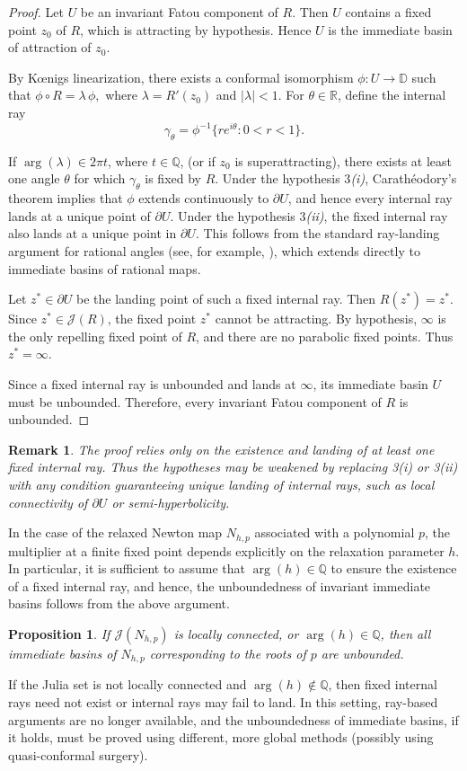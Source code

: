 \documentclass[12pt]{article}
\newtheorem{prop}{Proposition}[section]
\newtheorem{rem}{Remark}[section]
\numberwithin{equation}{section}
\begin{document}
\begin{proof}
Let $U$ be an invariant Fatou component of $R$.
Then $U$ contains a fixed point $z_0$ of $R$, which is attracting by hypothesis.
Hence $U$ is the immediate basin of attraction of $z_0$.
	
By K{\oe}nigs linearization, there exists a conformal isomorphism $\phi:U\to\mathbb D$
such that $\phi\circ R = \lambda\,\phi,$
where $\lambda=R'(z_0)$ and $|\lambda|<1$. For $\theta\in\mathbb R$, define the internal ray
$$\gamma_\theta=\phi^{-1}\{re^{i\theta}:0<r<1\}.$$
	
If $\arg(\lambda) \in 2\pi t$, where $t \in \mathbb Q$, (or if $z_0$ is superattracting), there exists at least one angle $\theta$ for which $\gamma_\theta$ is fixed by $R$.
Under the hypothesis 3\emph{(i)}, Carath\'eodory's theorem implies that $\phi$ extends continuously to $\partial U$, and hence every internal ray lands at a unique point of $\partial U$.
Under the hypothesis 3\emph{(ii)}, the fixed internal ray also lands at a unique point in $\partial U$. This follows from the standard ray-landing argument for rational angles (see, for example, \cite[Theorem 18.10]{Milnor_book}), which extends directly to immediate basins of rational maps.
	
Let $z^*\in\partial U$ be the landing point of such a fixed internal ray.
Then $R(z^*)=z^*$.
Since $z^*\in \mathcal{J}(R)$, the fixed point $z^*$ cannot be attracting.
By hypothesis, $\infty$ is the only repelling fixed point of $R$, and there are no parabolic fixed points.
Thus $z^*=\infty$.
	
Since a fixed internal ray is unbounded and lands at $\infty$, its immediate basin $U$ must be unbounded.
Therefore, every invariant Fatou component of $R$ is unbounded.
\end{proof}

\begin{rem}
The proof relies only on the existence and landing of at least one fixed internal ray.
Thus the hypotheses may be weakened by replacing \emph{3}(i) or \emph{3}(ii) with any condition guaranteeing unique landing of internal rays, such as local connectivity of $\partial U$ or semi-hyperbolicity.
\end{rem}	
In the case of the relaxed Newton map $N_{h,p}$ associated with a polynomial $p$, the multiplier at a finite fixed point depends explicitly on the relaxation parameter $h$.
In particular, it is sufficient to assume that $\arg(h)\in\mathbb Q$ to ensure the existence of a fixed internal ray, and hence, the unboundedness of invariant immediate basins follows from the above argument.
\begin{prop}\label{unbdd_imm}
If $\mathcal{J}(N_{h,p})$ is locally connected, or $\arg(h)\in\mathbb{Q}$, then all immediate basins of $N_{h,p}$ corresponding to the roots of $p$ are unbounded.
\end{prop}	
If the Julia set is not locally connected and $\arg(h)\notin\mathbb Q$, then fixed internal rays need not exist or internal rays may fail to land.
In this setting, ray-based arguments are no longer available, and the unboundedness of immediate basins, if it holds, must be proved using different, more global methods (possibly  using quasi-conformal surgery). 
\end{document}
